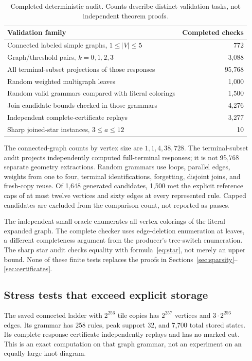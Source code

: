 \documentclass[11pt,a4paper]{article}
\theoremstyle{definition}
\theoremstyle{remark}
\begin{document}
\begin{table}[ht]
\centering
\begin{tabular}{lr}
\toprule
Validation family & Completed checks\\
\midrule
Connected labeled simple graphs, $1\le |V|\le5$ & 772\\
Graph/threshold pairs, $k=0,1,2,3$ & 3,088\\
All terminal-subset projections of those responses & 95,768\\
Random weighted multigraph leaves & 1,000\\
Random valid grammars compared with literal colorings & 1,500\\
Join candidate bounds checked in those grammars & 4,276\\
Independent complete-certificate replays & 3,277\\
Sharp joined-star instances, $3\le a\le12$ & 10\\
\bottomrule
\end{tabular}
\caption{Completed deterministic audit. Counts describe distinct validation tasks, not independent theorem proofs.}
\label{tab:audit}
\end{table}
The connected-graph counts by vertex size are $1,1,4,38,728$. The terminal-subset audit projects independently computed full-terminal responses; it is not 95,768 separate geometry extractions. Random grammars use loops, parallel edges, weights from one to four, terminal identifications, forgetting, disjoint joins, and fresh-copy reuse. Of 1,648 generated candidates, 1,500 met the explicit reference caps of at most twelve vertices and sixty edges at every represented rule. Capped candidates are excluded from the comparison count, not reported as passes.

The independent small oracle enumerates all vertex colorings of the literal expanded graph. The complete checker uses edge-deletion enumeration at leaves, a different completeness argument from the producer's tree-switch enumeration. The sharp star audit checks equality with formula~\eqref{eq:star}, not merely an upper bound. None of these finite tests replaces the proofs in Sections~\ref{sec:sparsity}--\ref{sec:certificates}.

\subsection{Stress tests that exceed explicit storage}
The saved connected ladder with $2^{256}$ tile copies has $2^{257}$ vertices and $3\cdot2^{256}$ edges. Its grammar has 258 rules, peak support 32, and 7,700 total stored states. Its complete response certificate independently replays and has no marked cut. This is an exact computation on that graph grammar, not an experiment on an equally large knot diagram.
\end{document}
